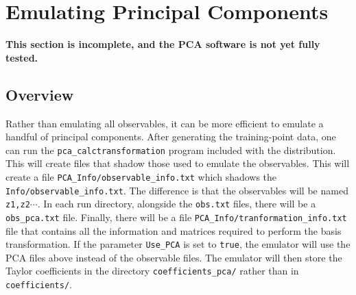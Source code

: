 \documentclass[UserManual.tex]{subfiles}
\begin{document}
\setcounter{section}{5}
\section{Emulating Principal Components}\label{sec:pca}

{\bf This section is incomplete, and the PCA software is not yet fully tested.}

\subsection{Overview}

Rather than emulating all observables, it can be more efficient to emulate a handful of principal components. After generating the training-point data, one can run the {\tt pca\_calctransformation} program included with the distribution. This will create files that shadow those used to emulate the observables. This will create a file {\tt PCA\_Info/observable\_info.txt} which shadows the  {\tt Info/observable\_info.txt}. The difference is that the observables will be named {\tt z1,z2}$\cdots$. In each run directory, alongside the {\tt obs.txt} files, there will be a {\tt obs\_pca.txt} file. Finally, there will be a file {\tt PCA\_Info/tranformation\_info.txt} file that contains all the information and matrices required to perform the basis transformation. If the parameter {\tt Use\_PCA} is set to {\tt true}, the emulator will use the PCA files above instead of the observable files. The emulator will then store the Taylor coefficients in the directory {\tt coefficients\_pca/} rather than in {\tt coefficients/}. 
\end{document}
